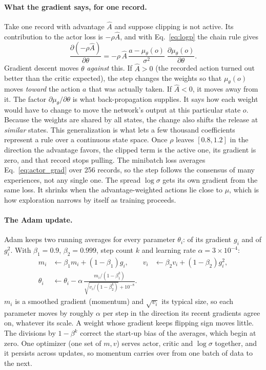 \paragraph{What the gradient says, for one record.}
Take one record with advantage $\hat A$ and suppose clipping is not active.
Its contribution to the actor loss is $-\rho\hat A$, and with
Eq.~\eqref{eq:logp} the chain rule gives
\begin{equation}
\frac{\partial(-\rho\hat A)}{\partial\theta}
= -\rho\,\hat A\,\frac{a-\mu_\theta(o)}{\sigma^2}\;\frac{\partial\mu_\theta(o)}{\partial\theta}.
\label{eq:actor_grad}
\end{equation}
Gradient descent moves $\theta$ \emph{against} this. If $\hat A>0$ (the
recorded action turned out better than the critic expected), the step
changes the weights so that $\mu_\theta(o)$ moves \emph{toward} the action
$a$ that was actually taken. If $\hat A<0$, it moves away from it. The
factor $\partial\mu_\theta/\partial\theta$ is what back-propagation
supplies. It says how each weight would have to change to move the
network's output at this particular state $o$. Because the weights are
shared by all states, the change also shifts the release at
\emph{similar} states. This generalization is what lets a few thousand
coefficients represent a rule over a continuous state space. Once
$\rho$ leaves $[0.8,1.2]$ in the direction the advantage favors, the
clipped term is the active one, its gradient is zero, and that record stops
pulling. The minibatch loss averages Eq.~\eqref{eq:actor_grad} over 256
records, so the step follows the consensus of many experiences, not any
single one. The spread $\log\sigma$ gets its own gradient from the same
loss. It shrinks when the advantage-weighted actions lie close to $\mu$,
which is how exploration narrows by itself as training proceeds.

\paragraph{The Adam update.}
Adam keeps two running averages for every parameter $\theta_i$: of its
gradient $g_i$ and of $g_i^2$. With $\beta_1=0.9$, $\beta_2=0.999$, step
count $k$ and learning rate $\alpha=3\times10^{-4}$:
\begin{align}
m_i &\leftarrow \beta_1 m_i+(1-\beta_1)g_i, &
v_i &\leftarrow \beta_2 v_i+(1-\beta_2)g_i^2,\nonumber\\
\theta_i &\leftarrow \theta_i-\alpha\,
  \frac{m_i/(1-\beta_1^k)}{\sqrt{v_i/(1-\beta_2^k)}+10^{-8}} .
\label{eq:adam}
\end{align}
$m_i$ is a smoothed gradient (momentum) and $\sqrt{v_i}$ its typical size,
so each parameter moves by roughly $\alpha$ per step in the direction its
recent gradients agree on, whatever its scale. A weight whose gradient
keeps flipping sign moves little. The divisions by $1-\beta^k$ correct the
start-up bias of the averages, which begin at zero. One optimizer (one set
of $m,v$) serves actor, critic and $\log\sigma$ together, and it persists
across updates, so momentum carries over from one batch of data to the
next.

